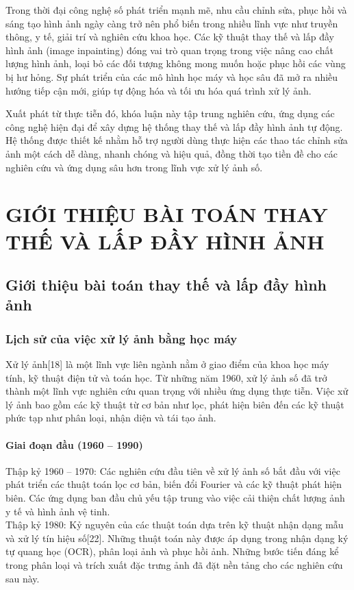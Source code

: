 \documentclass[12pt]{report}
\begin{document}
Trong thời đại công nghệ số phát triển mạnh mẽ, nhu cầu chỉnh sửa, phục hồi và sáng tạo hình ảnh ngày càng trở nên phổ biến trong nhiều lĩnh vực như truyền thông, y tế, giải trí và nghiên cứu khoa học. Các kỹ thuật thay thế và lấp đầy hình ảnh (image inpainting) đóng vai trò quan trọng trong việc nâng cao chất lượng hình ảnh, loại bỏ các đối tượng không mong muốn hoặc phục hồi các vùng bị hư hỏng. Sự phát triển của các mô hình học máy và học sâu đã mở ra nhiều hướng tiếp cận mới, giúp tự động hóa và tối ưu hóa quá trình xử lý ảnh.

Xuất phát từ thực tiễn đó, khóa luận này tập trung nghiên cứu, ứng dụng các công nghệ hiện đại để xây dựng hệ thống thay thế và lấp đầy hình ảnh tự động. Hệ thống được thiết kế nhằm hỗ trợ người dùng thực hiện các thao tác chỉnh sửa ảnh một cách dễ dàng, nhanh chóng và hiệu quả, đồng thời tạo tiền đề cho các nghiên cứu và ứng dụng sâu hơn trong lĩnh vực xử lý ảnh số.

\chapter{GIỚI THIỆU BÀI TOÁN THAY THẾ VÀ LẤP ĐẦY HÌNH ẢNH}

\section{Giới thiệu bài toán thay thế và lấp đầy hình ảnh}

\subsection{Lịch sử của việc xử lý ảnh bằng học máy}

Xử lý ảnh[18] là một lĩnh vực liên ngành nằm ở giao điểm của khoa học máy tính, kỹ thuật điện tử và toán học. Từ những năm 1960, xử lý ảnh số đã trở thành một lĩnh vực nghiên cứu quan trọng với nhiều ứng dụng thực tiễn. Việc xử lý ảnh bao gồm các kỹ thuật từ cơ bản như lọc, phát hiện biên đến các kỹ thuật phức tạp như phân loại, nhận diện và tái tạo ảnh.

\subsubsection{Giai đoạn đầu (1960 – 1990)}

Thập kỷ 1960 – 1970: Các nghiên cứu đầu tiên về xử lý ảnh số bắt đầu với việc phát triển các thuật toán lọc cơ bản, biến đổi Fourier và các kỹ thuật phát hiện biên. Các ứng dụng ban đầu chủ yếu tập trung vào việc cải thiện chất lượng ảnh y tế và hình ảnh vệ tinh.\\
Thập kỷ 1980: Kỷ nguyên của các thuật toán dựa trên kỹ thuật nhận dạng mẫu và xử lý tín hiệu số[22]. Những thuật toán này được áp dụng trong nhận dạng ký tự quang học (OCR), phân loại ảnh và phục hồi ảnh. Những bước tiến đáng kể trong phân loại và trích xuất đặc trưng ảnh đã đặt nền tảng cho các nghiên cứu sau này.
\end{document}
